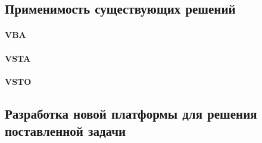 \subsection{Применимость существующих решений}
\paragraph{VBA}
\paragraph{VSTA}
\paragraph{VSTO}
\subsection{Разработка новой платформы для решения поставленной задачи}

\pagebreak